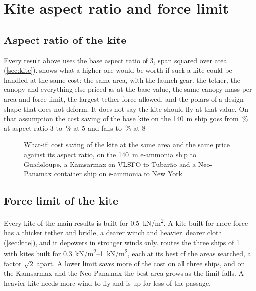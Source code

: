 \section{Kite aspect ratio and force limit}
\label{sec:further}

\subsection{Aspect ratio of the kite}
\label{sec:res_aspect}

Every result above uses the base aspect ratio of 3, span squared over area (\cref{sec:kite}).  shows what a higher one would be worth if such a kite could be handled at the same cost: the same area, with the launch gear, the tether, the canopy and everything else priced as at the base value, the same canopy mass per area and force limit, the largest tether force allowed, and the polars of a design shape that does not deform. It does not say the kite should fly at that value. On that assumption the cost saving of the base kite on the \SI{140}{m} ship goes from \,\% at aspect ratio 3 to \,\% at 5 and falls to \,\% at 8. 

\begin{figure}[tbp]
\centering
{}
\caption{What-if: cost saving of the kite at the same area and the same price against its aspect ratio, on the \SI{140}{m} e-ammonia ship to Guadeloupe, a Kamsarmax on VLSFO to Tubarão and a Neo-Panamax container ship on e-ammonia to New York.}
\label{fig:aspect}
\end{figure}

\subsection{Force limit of the kite}
\label{sec:res_force}

Every kite of the main results is built for \SI{0.5}{kN/m^2}. A kite built for more force has a thicker tether and bridle, a dearer winch and heavier, dearer cloth (\cref{sec:kite}), and it depowers in stronger winds only.  routes the three ships of \cref{fig:aspect} with kites built for \SIrange{0.3}{1}{kN/m^2}, each at its best of the areas searched, a factor $\sqrt2$ apart. A lower limit saves more of the cost on all three ships, and on the Kamsarmax and the Neo-Panamax the best area grows as the limit falls. A heavier kite needs more wind to fly and is up for less of the passage.

